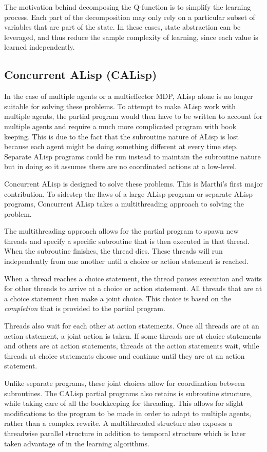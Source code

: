 \documentclass[jair,twoside,11pt,theapa]{article}
\begin{document}
The motivation behind decomposing the Q-function is to simplify the learning process. Each part of the decomposition may only rely on a particular subset of variables that are part of the state. In these cases, state abstraction can be leveraged, and thus reduce the sample complexity of learning, since each value is learned independently. 


\subsection{Concurrent ALisp (CALisp)}
\label{CALisp}
In the case of multiple agents or a multieffector MDP, ALisp alone is no longer suitable for solving these problems. To attempt to make ALisp work with multiple agents, the partial program would then have to be written to account for multiple agents and require a much more complicated program with book keeping. This is due to the fact that the subroutine nature of ALisp is lost because each agent might be doing something different at every time step. Separate ALisp programs could be run instead to maintain the subroutine nature but in doing so it assumes there are no coordinated actions at a low-level. 

Concurrent ALisp is designed to solve these problems. This is Marthi's first major contribution. To sidestep the flaws of a large ALisp program or separate ALisp programs, Concurrent ALisp takes a multithreading approach to solving the problem.

The multithreading approach allows for the partial program to spawn new threads and specify a specific subroutine that is then executed in that thread. When the subroutine finishes, the thread dies. These threads will run independently from one another until a choice or action statement is reached. 

When a thread reaches a choice statement, the thread pauses execution and waits for other threads to arrive at a choice or action statement. All threads that are at a choice statement then make a joint choice. This choice is based on the \textit{completion} that is provided to the partial program. 

Threads also wait for each other at action statements. Once all threads are at an action statement, a joint action is taken. If some threads are at choice statements and others are at action statements, threads at the action statements wait, while threads at choice statements choose and continue until they are at an action statement.  

Unlike separate programs, these joint choices allow for coordination between subroutines. The CALisp partial programs also retains is subroutine structure, while taking care of all the bookkeeping for threading. This allows for slight modifications to the program to be made in order to adapt to multiple agents, rather than a complex rewrite. A multithreaded structure also exposes a threadwise parallel structure in addition to temporal structure which is later taken advantage of in the learning algorithms. 
\end{document}
